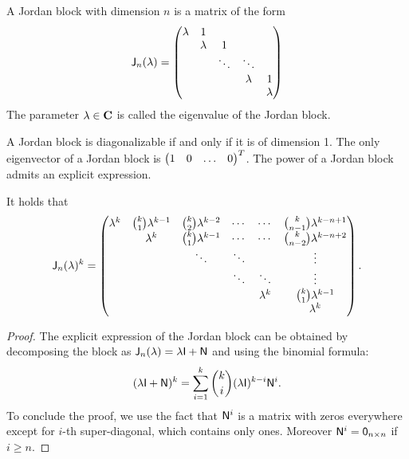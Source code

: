 \begin{definition}
    A Jordan block with dimension $n$ is a matrix of the form
    \[
        \mathsf J_{n}(\lambda) =
        \begin{pmatrix}
            \lambda & 1  \\
          & \lambda & 1 \\
          &         & \ddots  & \ddots  \\
          &         &         & \lambda & 1  \\
          &         &         &         & \lambda
        \end{pmatrix}
    \]
    The parameter $\lambda \in \mathbf C$ is called the eigenvalue of the Jordan block.
\end{definition}
A Jordan block is diagonalizable if and only if it is of dimension 1.
The only eigenvector of a Jordan block is $\begin{pmatrix} 1 & 0 & \hdots & 0 \end{pmatrix}^T$.
The power of a Jordan block admits an explicit expression.
\begin{lemma}
    \label{lemma:matrices_power_jordan_block}
    It holds that
    \begin{equation}
        \label{eq:matrices_power_jordan_block}
        \mathsf J_n(\lambda)^k =
        \begin{pmatrix}
            \lambda^k & \binom{k}{1}\lambda^{k-1} & \binom{k}{2}\lambda^{k-2} & \cdots & \cdots & \binom{k}{n-1}\lambda^{k-n+1} \\
                      & \lambda^k & \binom{k}{1}\lambda^{k-1} & \cdots & \cdots & \binom{k}{n-2}\lambda^{k-n+2} \\
                      &  & \ddots & \ddots &  & \vdots\\
                      &  & & \ddots & \ddots & \vdots\\
                      &  & &  & \lambda^k & \binom{k}{1}\lambda^{k-1}\\
                      &  &  &  &  & \lambda^k
        \end{pmatrix}.
    \end{equation}
\end{lemma}
\begin{proof}
    The explicit expression of the Jordan block can be obtained by decomposing the block as $\mathsf J_{n}(\lambda) = \lambda \mathsf I + \mathsf N$
    and using the binomial formula:
    \[
        (\lambda \mathsf I + \mathsf N)^k =
        \sum_{i=1}^{k} \binom{k}{i} (\lambda \mathsf I)^{k-i} \mathsf N^{i}.
    \]
    To conclude the proof,
    we use the fact that $\mathsf N^{i}$ is a matrix with zeros everywhere except for $i$-th super-diagonal,
    which contains only ones.
    Moreover $\mathsf N^i = \mathsf 0_{n \times n}$ if $i \geq n$.
\end{proof}

